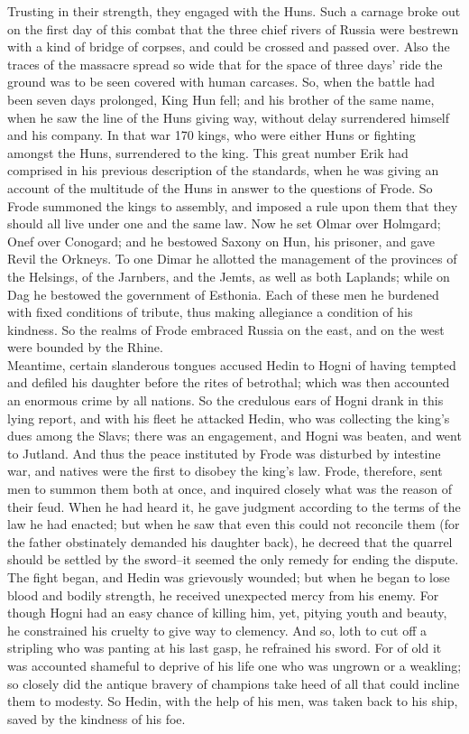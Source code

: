 \documentclass[10pt,a4paper]{report}
\begin{document}
Trusting in their strength, they engaged with the Huns. Such a carnage broke out on the first day of this combat that the three chief rivers of Russia were bestrewn with a kind of bridge of corpses, and could be crossed and passed over. Also the traces of the massacre spread so wide that for the space of three days' ride the ground was to be seen covered with human carcases. So, when the battle had been seven days prolonged, King Hun fell; and his brother of the same name, when he saw the line of the Huns giving way, without delay surrendered himself and his company. In that war 170 kings, who were either Huns or fighting amongst the Huns, surrendered to the king. This great number Erik had comprised in his previous description of the standards, when he was giving an account of the multitude of the Huns in answer to the questions of Frode. So Frode summoned the kings to assembly, and imposed a rule upon them that they should all live under one and the same law. Now he set Olmar over Holmgard; Onef over Conogard; and he bestowed Saxony on Hun, his prisoner, and gave Revil the Orkneys. To one Dimar he allotted the management of the provinces of the Helsings, of the Jarnbers, and the Jemts, as well as both Laplands; while on Dag he bestowed the government of Esthonia. Each of these men he burdened with fixed conditions of tribute, thus making allegiance a condition of his kindness. So the realms of Frode embraced Russia on the east, and on the west were bounded by the Rhine.\\

Meantime, certain slanderous tongues accused Hedin to Hogni of having tempted and defiled his daughter before the rites of betrothal; which was then accounted an enormous crime by all nations. So the credulous ears of Hogni drank in this lying report, and with his fleet he attacked Hedin, who was collecting the king's dues among the Slavs; there was an engagement, and Hogni was beaten, and went to Jutland. And thus the peace instituted by Frode was disturbed by intestine war, and natives were the first to disobey the king's law. Frode, therefore, sent men to summon them both at once, and inquired closely what was the reason of their feud. When he had heard it, he gave judgment according to the terms of the law he had enacted; but when he saw that even this could not reconcile them (for the father obstinately demanded his daughter back), he decreed that the quarrel should be settled by the sword--it seemed the only remedy for ending the dispute. The fight began, and Hedin was grievously wounded; but when he began to lose blood and bodily strength, he received unexpected mercy from his enemy. For though Hogni had an easy chance of killing him, yet, pitying youth and beauty, he constrained his cruelty to give way to clemency. And so, loth to cut off a stripling who was panting at his last gasp, he refrained his sword. For of old it was accounted shameful to deprive of his life one who was ungrown or a weakling; so closely did the antique bravery of champions take heed of all that could incline them to modesty. So Hedin, with the help of his men, was taken back to his ship, saved by the kindness of his foe.\\
\end{document}
